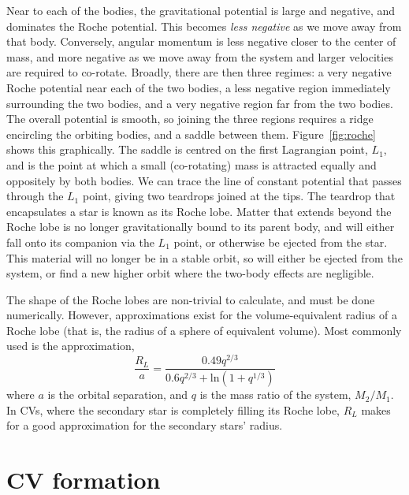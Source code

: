 Near to each of the bodies, the gravitational potential is large and negative, and dominates the Roche potential. This becomes \textit{less negative} as we move away from that body. Conversely, angular momentum is less negative closer to the center of mass, and more negative as we move away from the system and larger velocities are required to co-rotate. Broadly, there are then three regimes: a very negative Roche potential near each of the two bodies, a less negative region immediately surrounding the two bodies, and a very negative region far from the two bodies. The overall potential is smooth, so joining the three regions requires a ridge encircling the orbiting bodies, and a saddle between them. Figure~\ref{fig:roche} shows this graphically. The saddle is centred on the first Lagrangian point, $L_1$, and is the point at which a small (co-rotating) mass is attracted equally and oppositely by both bodies. We can trace the line of constant potential that passes through the $L_1$ point, giving two teardrops joined at the tips. The teardrop that encapsulates a star is known as its Roche lobe. Matter that extends beyond the Roche lobe is no longer gravitationally bound to its parent body, and will either fall onto its companion via the $L_1$ point, or otherwise be ejected from the star. This material will no longer be in a stable orbit, so will either be ejected from the system, or find a new higher orbit where the two-body effects are negligible.

The shape of the Roche lobes are non-trivial to calculate, and must be done numerically. However, approximations exist for the volume-equivalent radius of a Roche lobe (that is, the radius of a sphere of equivalent volume). Most commonly used is the \citet{Eggleton1983} approximation,
\begin{equation}
    \label{eqn:eggleton approximation}
    \frac{R_L}{a} = \frac{0.49 q^{2/3}}{0.6 q^{2/3} + \mathrm{ln}(1 + q^{1/3})}
\end{equation}
where $a$ is the orbital separation, and $q$ is the mass ratio of the system, $M_2 / M_1$. In CVs, where the secondary star is completely filling its Roche lobe, $R_L$ makes for a good approximation for the secondary stars' radius.

\section{CV formation}
\label{sect:introduction:formation of CVs}


